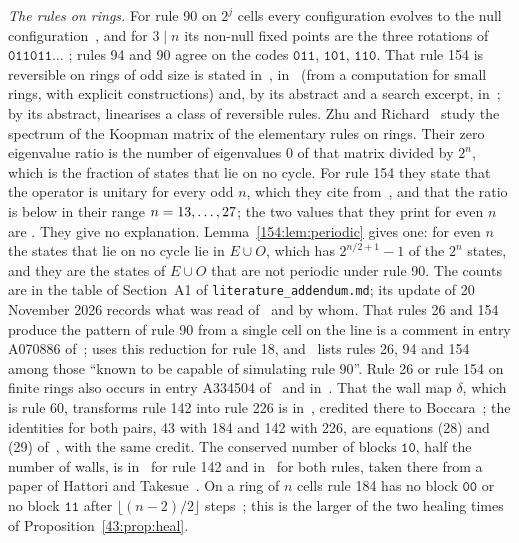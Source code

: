 \documentclass[10pt,a4paper]{article}
\newcommand{\code}[1]{\mathtt{#1}}            %
\begin{document}
\emph{The rules on rings.}
For rule 90 on $2^j$ cells every configuration evolves to the null
configuration~\cite[Lemma~3.5]{MartinOdlyzkoWolfram1984}, and for $3\mid n$ its non-null fixed points are the three
rotations of $\code{011011}\ldots$ \cite[Lemma~3.7]{MartinOdlyzkoWolfram1984}; rules 94 and 90 agree on the codes
$\code{011}$, $\code{101}$, $\code{110}$. That rule 154 is reversible on rings of odd size is stated
in~\cite{BhattacharjeeDas2019}, in~\cite{Fedoriaka2025} (from a computation for small rings, with explicit
constructions) and, by its abstract and a search excerpt, in~\cite{NobeYura2004}; by its abstract,
\cite{NobeYura2007} linearises a class of reversible rules. Zhu and Richard~\cite{ZhuRichard2026} study the
spectrum of the Koopman matrix of the elementary rules on rings. Their zero eigenvalue ratio is the number of
eigenvalues $0$ of that matrix divided by $2^n$, which is the fraction of states that lie on no cycle. For rule 154
they state that the operator is unitary for every odd $n$, which they cite from~\cite{NobeYura2004}, and that the
ratio is below \ZRBound{} in their range $n=13,\dots,27$; the two values that they print for even $n$ are
\ZRValues. They give no explanation. Lemma~\ref{154:lem:periodic} gives one: for even $n$ the states that lie on no cycle lie in $E\cup O$,
which has $2^{n/2+1}-1$ of the $2^n$ states, and they are the states of $E\cup O$ that are not periodic under rule
90. The counts are in the table of Section~A1 of \texttt{literature\_addendum.md}; its update of 20 November 2026
records what was read of~\cite{ZhuRichard2026} and by whom. That rules 26 and 154 produce the pattern of rule 90
from a single cell on the line is a comment in entry A070886 of~\cite{OEIS};
\cite[Section~5]{MartinOdlyzkoWolfram1984} uses this reduction for rule 18, and~\cite{Nordahl1989} lists rules 26,
94 and 154 among those ``known to be capable of simulating rule 90''. Rule 26 or rule 154 on finite rings also
occurs in entry A334504 of~\cite{OEIS} and in~\cite{Stricker2023}. That the wall map $\delta$, which is rule 60,
transforms rule 142 into rule 226 is in~\cite{Fuks2005}, credited there to Boccara~\cite{Boccara1993}; the
identities for both pairs, 43 with 184 and 142 with 226, are equations (28) and (29) of~\cite{Fuks2005b}, with the
same credit. The conserved number of blocks $\code{10}$, half the number of walls, is in~\cite{Fuks2005} for rule
142 and in~\cite{Fuks2005b} for both rules, taken there from a paper of Hattori and
Takesue~\cite{HattoriTakesue1991}. On a ring of $n$ cells
rule 184 has no block $\code{00}$ or no block $\code{11}$ after $\lfloor (n-2)/2\rfloor$ steps~\cite{Fuks1997};
this is the larger of the two healing times of Proposition~\ref{43:prop:heal}.
\end{document}
